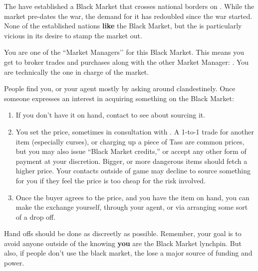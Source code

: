 \documentclass[green]{GL2020}
\begin{document}
\name{\gBMRun{}}

The \pGoaties{} have established a Black Market that crosses national borders on \pEarth{}. While the market pre-dates the war, the demand for it has redoubled since the war started. None of the established nations \textbf{like} the Black Market, but the \pTech{} is particularly vicious in its desire to stamp the market out.

You are one of the ``Market Managers’’ for this Black Market. This means you get to broker trades and purchases along with the other Market Manager: \cChupInventor{\full}. You are technically the one in charge of the market.

People find you, or your agent \cLibAssist{\full} mostly by asking around clandestinely. Once someone expresses an interest in acquiring something on the Black Market:

\begin{enumerate}
  \item If you don’t have it on hand, contact \cChupInventor{} to see about sourcing it.
  \item You set the price, sometimes in consultation with \cChupInventor{}. A 1-to-1 trade for another item (especially curses), or charging up a piece of Tass are common prices, but you may also issue “Black Market credits,” or accept any other form of payment at your discretion. Bigger, or more dangerous items should fetch a higher price. Your contacts outside of game may decline to source something for you if they feel the price is too cheap for the risk involved.
  \item Once the buyer agrees to the price, and you have the item on hand, you can make the exchange yourself, through your agent, or via arranging some sort of a drop off.
\end{enumerate}

Hand offs should be done as discreetly as possible. Remember, your goal is to avoid anyone outside of the \pGoaties{} knowing \textbf{you} are the Black Market lynchpin. But also, if people don’t use the black market, the \pGoaties{} lose a major source of funding and power.  
\end{document}
